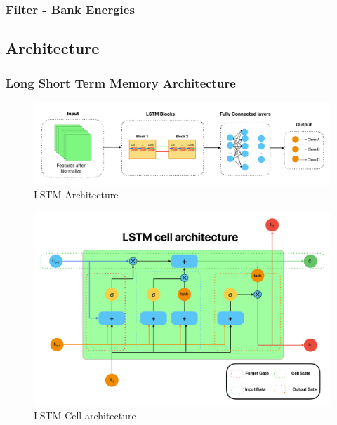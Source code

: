 \documentclass[conference, 10pt,onecolumn]{IEEEtran}
\begin{document}
\subsubsection{Filter - Bank Energies}

\subsection{Architecture}
\subsubsection{Long Short Term Memory Architecture}
\begin{figure}
    \centering
    \includegraphics[width=7 in]{LSTM architecture.pdf}
    \caption{LSTM Architecture}
    \label{fig:LSTM architecture}
\end{figure}
\begin{figure}
    \centering
    \includegraphics[width=4 in]{LSTM cell architecture.pdf}
    \caption{LSTM Cell architecture}
    \label{fig:LSTM cell architecture}
\end{figure}
\end{document}
